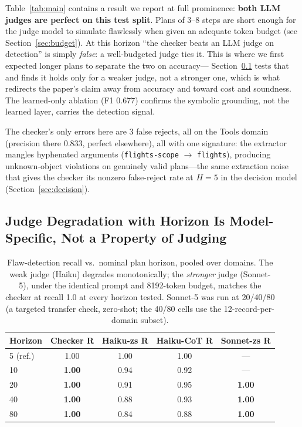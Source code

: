 \documentclass[letterpaper]{article}
\begin{document}
Table~\ref{tab:main} contains a result we report at full prominence:
\textbf{both LLM judges are perfect on this test split}. Plans of 3--8
steps are short enough for the judge model to simulate flawlessly when
given an adequate token budget (see Section~\ref{sec:budget}). At this
horizon ``the checker beats an LLM judge on detection'' is simply
\emph{false}: a well-budgeted judge ties it. This is where we first
expected longer plans to separate the two on accuracy---
Section~\ref{sec:horizon} tests that and finds it holds only for a weaker
judge, not a stronger one, which is what redirects the paper's claim away
from accuracy and toward cost and soundness. The learned-only ablation
(F1 0.677) confirms the symbolic grounding, not the learned layer, carries
the detection signal.

The checker's only errors here are 3 false rejects, all on the Tools domain
(precision there 0.833, perfect elsewhere), all with one signature: the
extractor mangles hyphenated arguments (\texttt{flights-scope} $\to$
\texttt{flights}), producing unknown-object violations on genuinely valid
plans---the same extraction noise that gives the checker its nonzero
false-reject rate at $H{=}5$ in the decision model
(Section~\ref{sec:decision}).

\subsection{Judge Degradation with Horizon Is Model-Specific, Not a
Property of Judging}
\label{sec:horizon}

\begin{table}[t]
\centering
\small
\setlength{\tabcolsep}{4pt}
\begin{tabular}{lcccc}
\toprule
Horizon & Checker R & Haiku-zs R & Haiku-CoT R & Sonnet-zs R \\
\midrule
5 (ref.) & 1.00 & 1.00 & 1.00 & --- \\
10 & \textbf{1.00} & 0.94 & 0.92 & --- \\
20 & \textbf{1.00} & 0.91 & 0.95 & \textbf{1.00} \\
40 & \textbf{1.00} & 0.88 & 0.93 & \textbf{1.00} \\
80 & \textbf{1.00} & 0.84 & 0.88 & \textbf{1.00} \\
\bottomrule
\end{tabular}
\caption{Flaw-detection recall vs.\ nominal plan horizon, pooled over
domains. The weak judge (Haiku) degrades monotonically; the \emph{stronger}
judge (Sonnet-5), under the identical prompt and 8192-token budget, matches
the checker at recall 1.0 at every horizon tested. Sonnet-5 was run at
20/40/80 (a targeted transfer check, zero-shot; the 40/80 cells use the
12-record-per-domain subset).}
\label{tab:horizon}
\end{table}
\end{document}
